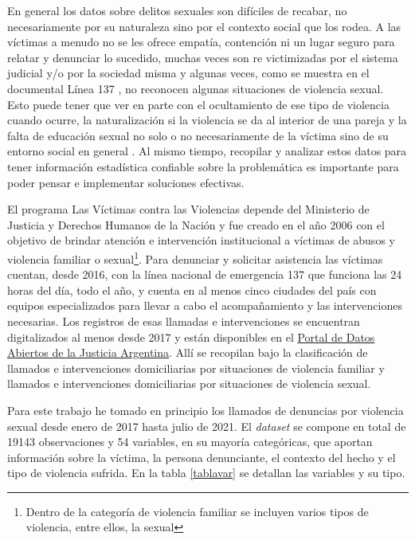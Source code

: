 \documentclass[10 pt]{article}
\begin{document}
En general los datos sobre delitos sexuales son difíciles de recabar, no necesariamente por su naturaleza sino por el contexto social que los rodea. A las víctimas a menudo no se les ofrece empatía, contención ni un lugar seguro para relatar y denunciar lo sucedido, muchas veces son re victimizadas por el sistema judicial y/o por la sociedad misma y algunas veces, como se muestra en el documental Línea 137 \citep{vasallo2020linea137}, no reconocen algunas situaciones de violencia sexual. Esto puede tener que ver en parte con el ocultamiento de ese tipo de violencia cuando ocurre, la naturalización si la violencia se da al interior de una pareja y la falta de educación sexual no solo o no necesariamente de la víctima sino de su entorno social en general \citep{contreras2016violencia}. Al mismo tiempo, recopilar y analizar estos datos para tener información estadística confiable sobre la problemática es importante para poder pensar e implementar soluciones efectivas.

El programa Las Víctimas contra las Violencias depende del Ministerio de Justicia y Derechos Humanos de la Nación y fue creado en el año 2006 con el objetivo de brindar atención e intervención institucional a víctimas de abusos y violencia familiar o sexual\footnote{Dentro de la categoría de violencia familiar se incluyen varios tipos de violencia, entre ellos, la sexual}. Para denunciar y solicitar asistencia las víctimas cuentan, desde 2016, con la línea nacional de emergencia 137 que funciona las 24 horas del día, todo el año, y cuenta en al menos cinco ciudades del país con equipos especializados para llevar a cabo el acompañamiento y las intervenciones necesarias. Los registros de esas llamadas e intervenciones se encuentran digitalizados al menos desde 2017 y están disponibles en el \href{http://datos.jus.gob.ar/}{Portal de Datos Abiertos de la Justicia Argentina}. Allí se recopilan bajo la clasificación de llamados e intervenciones domiciliarias por situaciones de violencia familiar y llamados e intervenciones domiciliarias por situaciones de violencia sexual. 

Para este trabajo he tomado en principio los llamados de denuncias por violencia sexual desde enero de 2017 hasta julio de 2021. El \textit{dataset} se compone en total de 19143 observaciones y 54 variables, en su mayoría categóricas, que aportan información sobre la víctima, la persona denunciante, el contexto del hecho y el tipo de violencia sufrida. En la tabla \ref{tablavar} se detallan las variables y su tipo.
\end{document}
